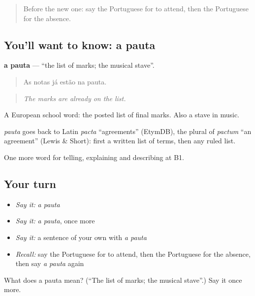 \begin{quote}
Before the new one: say the Portuguese for to attend, then the Portuguese for the absence.
\end{quote}

\subsection*{You'll want to know: a pauta}
\textbf{a pauta} — \textquotedblleft{}the list of marks; the musical stave\textquotedblright{}.

\begin{quote}
As notas já estão na pauta.
\end{quote}

\begin{quote}
\emph{The marks are already on the list.}
\end{quote}

A European school word: the posted list of final marks. Also a stave in music.

\begin{cousinweb}
\emph{pauta} goes back to Latin \emph{pacta} \textquotedblleft{}agreements\textquotedblright{} (EtymDB), the plural of \emph{pactum} \textquotedblleft{}an agreement\textquotedblright{} (Lewis \& Short): first a written list of terms, then any ruled list.
\end{cousinweb}

\begin{grammarlens}[title={What you've built}]
One more word for telling, explaining and describing at B1.
\end{grammarlens}

\subsection*{Your turn}
\begin{itemize}
\raggedright
  \item \emph{Say it:} \emph{a pauta}
  \item \emph{Say it:} \emph{a pauta}, once more
  \item \emph{Say it:} a sentence of your own with \emph{a pauta}
  \item \emph{Recall:} say the Portuguese for to attend, then the Portuguese for the absence, then say \emph{a pauta} again
\end{itemize}

\begin{tcolorbox}[breakable,colback=teal!4,colframe=teal!35!black,title={Before you move on}]
What does a pauta mean? (\textquotedblleft{}The list of marks; the musical stave\textquotedblright{}.) Say it once more.
\end{tcolorbox}
